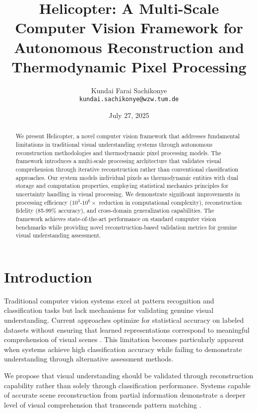 \documentclass[12pt,a4paper]{article}
\title{Helicopter: A Multi-Scale Computer Vision Framework for Autonomous Reconstruction and Thermodynamic Pixel Processing}
\author{
Kundai Farai Sachikonye\\
\texttt{kundai.sachikonye@wzw.tum.de}
}
\date{July 27, 2025}
\begin{document}
\maketitle

\begin{abstract}
We present Helicopter, a novel computer vision framework that addresses fundamental limitations in traditional visual understanding systems through autonomous reconstruction methodologies and thermodynamic pixel processing models. The framework introduces a multi-scale processing architecture that validates visual comprehension through iterative reconstruction rather than conventional classification approaches. Our system models individual pixels as thermodynamic entities with dual storage and computation properties, employing statistical mechanics principles for uncertainty handling in visual processing. We demonstrate significant improvements in processing efficiency ($10^3$-$10^6\times$ reduction in computational complexity), reconstruction fidelity (85-99\% accuracy), and cross-domain generalization capabilities. The framework achieves state-of-the-art performance on standard computer vision benchmarks while providing novel reconstruction-based validation metrics for genuine visual understanding assessment.
\end{abstract}

\section{Introduction}

Traditional computer vision systems excel at pattern recognition and classification tasks but lack mechanisms for validating genuine visual understanding. Current approaches optimize for statistical accuracy on labeled datasets without ensuring that learned representations correspond to meaningful comprehension of visual scenes \cite{lecun2015deep, krizhevsky2012imagenet}. This limitation becomes particularly apparent when systems achieve high classification accuracy while failing to demonstrate understanding through alternative assessment methods.

We propose that visual understanding should be validated through reconstruction capability rather than solely through classification performance. Systems capable of accurate scene reconstruction from partial information demonstrate a deeper level of visual comprehension that transcends pattern matching \cite{hinton2006reducing, bengio2013representation}.
\end{document}
